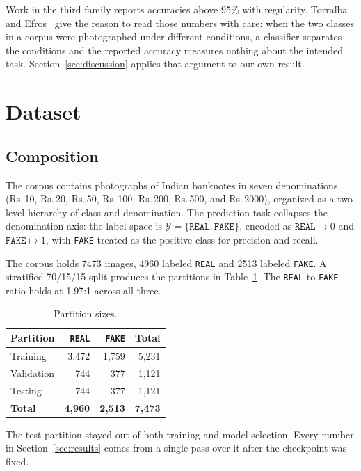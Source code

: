 \documentclass[conference]{IEEEtran}
\newcommand{\rupee}{Rs.\,}
\begin{document}
Work in the third family reports accuracies above 95\% with regularity. Torralba
and Efros~\cite{torralba2011bias} give the reason to read those numbers with
care: when the two classes in a corpus were photographed under different
conditions, a classifier separates the conditions and the reported accuracy
measures nothing about the intended task. Section~\ref{sec:discussion} applies
that argument to our own result.

\section{Dataset}

\subsection{Composition}

The corpus contains photographs of Indian banknotes in seven denominations
(\rupee10, \rupee20, \rupee50, \rupee100, \rupee200, \rupee500, and \rupee2000),
organized as a two-level hierarchy of class and denomination. The prediction
task collapses the denomination axis: the label space is
$\mathcal{Y} = \{\texttt{REAL}, \texttt{FAKE}\}$, encoded as
$\texttt{REAL} \mapsto 0$ and $\texttt{FAKE} \mapsto 1$, with \texttt{FAKE}
treated as the positive class for precision and recall.

The corpus holds 7473 images, 4960 labeled \texttt{REAL} and 2513 labeled
\texttt{FAKE}. A stratified 70/15/15 split produces the partitions in
Table~\ref{tab:splits}. The \texttt{REAL}-to-\texttt{FAKE} ratio holds at
1.97:1 across all three.

\begin{table}[t]
\caption{Partition sizes.}
\label{tab:splits}
\centering
\small
\begin{tabular}{@{}lrrr@{}}
\toprule
\textbf{Partition} & \textbf{\texttt{REAL}} & \textbf{\texttt{FAKE}} &
\textbf{Total} \\
\midrule
Training   & 3{,}472 & 1{,}759 & 5{,}231 \\
Validation & 744     & 377     & 1{,}121 \\
Testing    & 744     & 377     & 1{,}121 \\
\midrule
\textbf{Total} & \textbf{4{,}960} & \textbf{2{,}513} & \textbf{7{,}473} \\
\bottomrule
\end{tabular}
\end{table}

The test partition stayed out of both training and model selection. Every number
in Section~\ref{sec:results} comes from a single pass over it after the
checkpoint was fixed.
\end{document}
